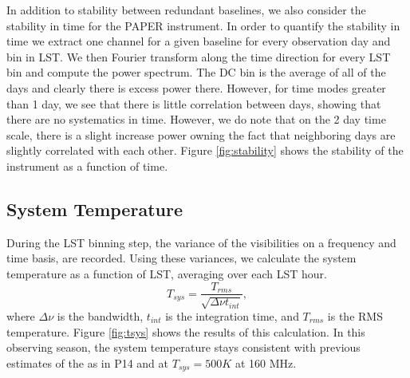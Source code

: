 \documentclass[twocolumn,numberedappendix]{emulateapj} \shorttitle{PSA64}
\begin{document}
In addition to stability between redundant baselines, we also consider the
stability in time for the PAPER instrument. In order to quantify the stability
in time we extract one channel for a given baseline for every observation day
and bin in LST. We then Fourier transform along the time direction for every LST
bin and compute the power spectrum. The DC bin is the average of all of the days
and clearly there is excess power there. However, for time modes greater than 1
day, we see that there is little correlation between days, showing that there
are no systematics in time. However, we do note that on the 2 day time scale,
there is a slight increase power owning the fact that neighboring days are
slightly correlated with each other.  Figure \ref{fig:stability} shows the
stability of the instrument as a function of time. 

\subsection{System Temperature}   
During the LST binning step, the variance of the visibilities on a frequency and
time basis, are recorded. Using these variances, we calculate the system
temperature as a function of LST, averaging over each LST hour. 
\begin{equation}
    T_{sys} = \frac{T_{rms}}{\sqrt{\Delta\nu t_{int}}}, 
\end{equation}
where $\Delta\nu$ is the bandwidth, $t_{int}$ is the integration time, and
$T_{rms}$ is the RMS temperature.
Figure \ref{fig:tsys} shows the results of this calculation. In this observing
season, the system temperature stays consistent with previous estimates of the
as in P14 and \citet{jacobs_et_al2014} at $T_{sys} =
500K$ at 160 MHz.
\end{document}
